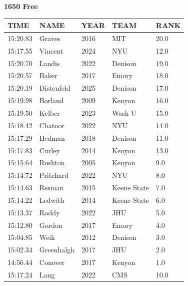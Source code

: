 \begin{table}[H]
\centering
\begin{minipage}[t]{0.6\textwidth}
\centering
\textbf{1650 Free}\\[0.1cm]
\begin{tabular}{@{}p{1.8cm}p{2.8cm}p{1.2cm}p{1.4cm}p{0.8cm}@{}}
\hline
    \textbf{TIME} & \textbf{NAME} & \textbf{YEAR} & \textbf{TEAM} & \textbf{RANK} \\
\hline
    15:20.83 & Graves & 2016 & MIT & 20.0 \\
    15:17.55 & Vincent & 2024 & NYU & 12.0 \\
    15:20.70 & Landis & 2022 & Denison & 19.0 \\
    15:20.57 & Baker & 2017 & Emory & 18.0 \\
    15:20.19 & Distenfeld & 2025 & Denison & 17.0 \\
    15:19.98 & Borland & 2009 & Kenyon & 16.0 \\
    15:19.50 & Kelber & 2023 & Wash U & 15.0 \\
    15:18.42 & Chatoor & 2022 & NYU & 14.0 \\
    15:17.29 & Hedman & 2018 & Denison & 11.0 \\
    15:17.83 & Curley & 2014 & Kenyon & 13.0 \\
    15:15.64 & Rushton & 2005 & Kenyon & 9.0 \\
    15:14.72 & Pritchard & 2022 & NYU & 8.0 \\
    15:14.63 & Resman & 2015 & Keene State & 7.0 \\
    15:14.22 & Ledwith & 2014 & Keene State & 6.0 \\
    15:13.37 & Roddy & 2022 & JHU & 5.0 \\
    15:12.80 & Gordon & 2017 & Emory & 4.0 \\
    15:04.85 & Weik & 2012 & Denison & 3.0 \\
    15:02.34 & Greenhalgh & 2017 & JHU & 2.0 \\
    14:56.44 & Conover & 2017 & Kenyon & 1.0 \\
    15:17.24 & Lang & 2022 & CMS & 10.0 \\
\hline
\end{tabular}
\end{minipage}
\end{table}

